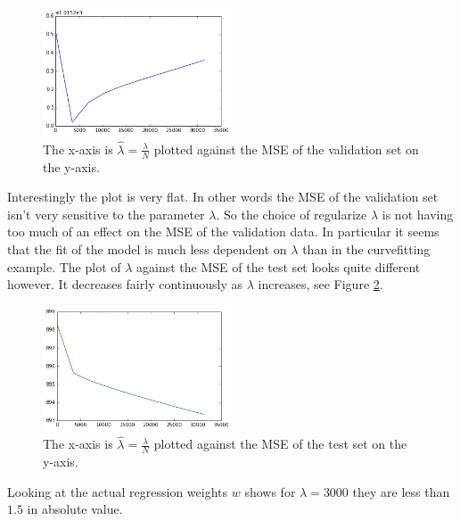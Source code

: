 \documentclass{article}
\begin{document}
%
%
%
\begin{figure}[h]
\centering
\includegraphics[width=0.5\textwidth]{blog-model-selection}
\caption{The x-axis is $\hat{\lambda} = \frac{\lambda}{N}$ plotted against the MSE of the validation set on the y-axis.}
\label{blog-model-selection}
\end{figure}
%
Interestingly the plot is very flat. In other words the MSE of the validation set isn't very sensitive to the parameter $\lambda$.  So the choice of regularize $\lambda$ is not having too much of an effect on the MSE of the validation data. In particular it seems that the fit of the model is much less dependent on $\lambda$ than in the curvefitting example.  The plot of $\lambda$ against the MSE of the test set looks quite different however. It decreases fairly continuously as $\lambda$ increases, see Figure \ref{blog-model-select-test}.
\begin{figure}[h]
\centering
\includegraphics[width=0.5\textwidth]{blog-model-select-test}
\caption{The x-axis is $\hat{\lambda} = \frac{\lambda}{N}$ plotted against the MSE of the test set on the y-axis.}
\label{blog-model-select-test}
\end{figure}
Looking at the actual regression weights $w$ shows for $\lambda = 3000$ they are less than $1.5$ in absolute value.

%
%
\end{document}
